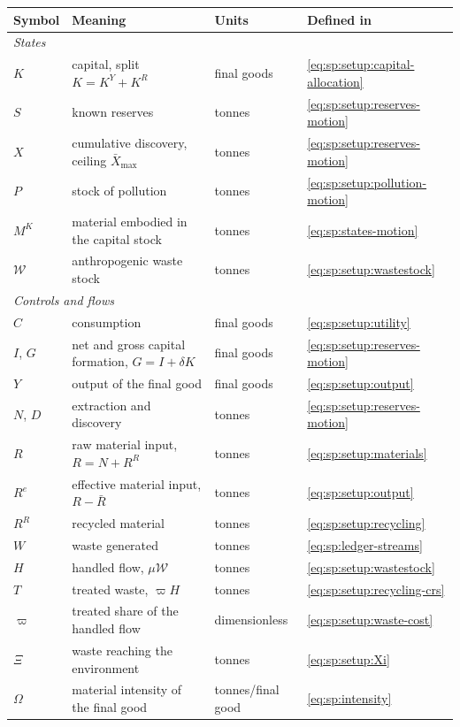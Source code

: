 \begin{center}
\begin{tabular}{llll}
\hline
Symbol & Meaning & Units & Defined in \\
\hline
\multicolumn{4}{l}{\textit{States}}\\
$K$ & capital, split $K=K^Y+K^R$ & final goods & \eqref{eq:sp:setup:capital-allocation}\\
$S$ & known reserves & tonnes & \eqref{eq:sp:setup:reserves-motion}\\
$X$ & cumulative discovery, ceiling $\bar X_{\max}$ & tonnes & \eqref{eq:sp:setup:reserves-motion}\\
$P$ & stock of pollution & tonnes & \eqref{eq:sp:setup:pollution-motion}\\
$M^K$ & material embodied in the capital stock & tonnes & \eqref{eq:sp:states-motion}\\
$\mathcal W$ & anthropogenic waste stock & tonnes & \eqref{eq:sp:setup:wastestock}\\
\multicolumn{4}{l}{\textit{Controls and flows}}\\
$C$ & consumption & final goods & \eqref{eq:sp:setup:utility}\\
$I$, $G$ & net and gross capital formation, $G=I+\delta K$ & final goods & \eqref{eq:sp:setup:reserves-motion}\\
$Y$ & output of the final good & final goods & \eqref{eq:sp:setup:output}\\
$N$, $D$ & extraction and discovery & tonnes & \eqref{eq:sp:setup:reserves-motion}\\
$R$ & raw material input, $R=N+R^R$ & tonnes & \eqref{eq:sp:setup:materials}\\
$R^e$ & effective material input, $R-\bar R$ & tonnes & \eqref{eq:sp:setup:output}\\
$R^R$ & recycled material & tonnes & \eqref{eq:sp:setup:recycling}\\
$W$ & waste generated & tonnes & \eqref{eq:sp:ledger-streams}\\
$H$ & handled flow, $\mu\mathcal W$ & tonnes & \eqref{eq:sp:setup:wastestock}\\
$T$ & treated waste, $\varpi H$ & tonnes & \eqref{eq:sp:setup:recycling-crs}\\
$\varpi$ & treated share of the handled flow & dimensionless & \eqref{eq:sp:setup:waste-cost}\\
$\Xi$ & waste reaching the environment & tonnes & \eqref{eq:sp:setup:Xi}\\
$\Omega$ & material intensity of the final good & tonnes/final good & \eqref{eq:sp:intensity}\\

\end{tabular}
\end{center}
